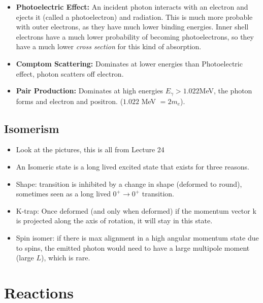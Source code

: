 \documentclass[letter]{article}
\begin{document}
\begin{itemize}
\item \textbf{Photoelectric Effect: }An incident photon interacts with an electron and ejects it
  (called a photoelectron) and radiation. This is much more probable
  with outer electrons, as they have much lower binding
  energies. Inner shell electrons have a much lower probability of becoming
  photoelectrons, so they have a much lower \textit{cross section} for
  this kind of absorption.~\cite[Lec. 24]{lecture}
\item \textbf{Comptom Scattering:} Dominates at lower energies than
  Photoelectric effect, photon scatters off electron.~\cite[Lec. 24]{lecture}
\item \textbf{Pair Production:} Dominates at high energies $E_\gamma >
  1.022 $MeV, the photon forms and electron and positron. ($1.022$ MeV
  $=2m_e$).
\end{itemize}

\subsection{Isomerism}

\begin{itemize}
\item Look at the pictures, this is all from Lecture 24~\cite[Lec. 24]{lecture}
\item An Isomeric state is a long lived excited state that exists for
  three reasons.
\item Shape: transition is inhibited by a change in shape (deformed to
  round), sometimes seen as a long lived $0^+ \to 0^+$ transition.
\item K-trap: Once deformed (and only when deformed) if the momentum
  vector k is projected along the axis of rotation, it will stay in
  this state.
\item Spin isomer: if there is max alignment in a high angular
  momentum state due to spins, the emitted photon would need to have a
  large multipole moment (large $L$), which is rare.
\end{itemize}

\section{Reactions}
\end{document}
